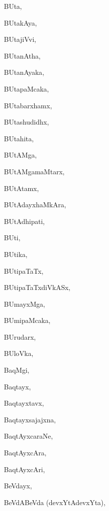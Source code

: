 \begin{multicols}{3}
{\noindent
{BUta}, \pageref{BUta}

\noindent
{BUtakAya}, \pageref{BUtakAya}

\noindent
{BUtajiVvi}, \pageref{BUtajiVvi}

\noindent
{BUtanAtha}, \pageref{BUtanAtha}

\noindent
{BUtanAyaka}, \pageref{BUtanAyaka}

\noindent
{BUtapaMcaka}, \pageref{BUtapaMcaka}

\noindent
{BUtabarxhamx}, \pageref{BUtabarxhamx}

\noindent
{BUtashudidhx}, \pageref{BUtashudidhx}

\noindent
{BUtahita}, \pageref{BUtahita}

\noindent
{BUtAMga}, \pageref{BUtAMga}

\noindent
{BUtAMgamaMtarx}, \pageref{BUtAMgamaMtarx}

\noindent
{BUtAtamx}, \pageref{BUtAtamx}

\noindent
{BUtAdayxhaMkAra}, \pageref{BUtAdayxhaMkAra}

\noindent
{BUtAdhipati}, \pageref{BUtAdhipati}

\noindent
{BUti}, \pageref{BUti}

\noindent
{BUtika}, \pageref{BUtika}

\noindent
{BUtipaTaTx}, \pageref{BUtipaTaTx}

\noindent
{BUtipaTaTxdiVkASx}, \pageref{BUtipaTaTxdiVkASx}

\noindent
{BUmayxMga}, \pageref{BUmayxMga}

\noindent
{BUmipaMcaka}, \pageref{BUmipaMcaka}

\noindent
{BUrudarx}, \pageref{BUrudarx}

\noindent
{BUloVka}, \pageref{BUloVka}

\noindent
{BaqMgi}, \pageref{BaqMgi}

\noindent
{Baqtayx}, \pageref{Baqtayx}

\noindent
{Baqtayxtavx}, \pageref{Baqtayxtavx}

\noindent
{Baqtayxsajajxna}, \pageref{Baqtayxsajajxna}

\noindent
{BaqtAyxcaraNe}, \pageref{BaqtAyxcaraNe}

\noindent
{BaqtAyxcAra}, \pageref{BaqtAyxcAra}

\noindent
{BaqtAyxcAri}, \pageref{BaqtAyxcAri}

\noindent
{BeVdayx}, \pageref{BeVdayx}

\noindent
{BeVdABeVda (devxYtAdevxYta)}, \pageref{BeVdABeVdadevxYtAdevxYta}

}
\end{multicols}
